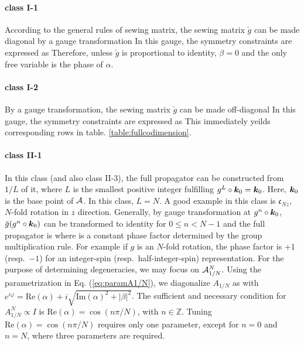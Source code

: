 \documentclass[aps, showpacs, twocolumn, notitlepage, superscriptaddress]{revtex4-1}
\begin{document}
\paragraph*{class I-1} According to the general rules of sewing matrix, the sewing matrix $\breve{g}$ can be made diagonal by a gauge transformation
In this gauge, the symmetry constraints are expressed as 
Therefore, unless $\breve{g}$ is proportional to identity, $\beta=0$ and the only free variable is the phase of $\alpha$.

\paragraph*{class I-2}
By a gauge transformation, the sewing matrix $\breve{g}$ can be made off-diagonal
In this gauge, the symmetry constraints are expressed as
This immediately yeilds corresponding rows in table. \ref{table:fullcodimension}.

\paragraph*{class II-1} In this class (and also class II-3), the full propagator can be constructed from $1/L$ of it, where $L$ is the smallest positive integer fulfilling $g^L\circ \boldsymbol{k}_0=\boldsymbol{k}_0$. Here, $\boldsymbol{k}_0$ is the base point of ${\cal A}$. In this class, $L=N$. A good example in this class is $\mathfrak{c}_{Nz}$, $N$-fold rotation in $z$ direction. Generally, by gauge transformation at $g^n\circ \boldsymbol{k}_0$, $\breve{g}(g^n\circ \boldsymbol{k}_0)$ can be transformed to identity for $0 \le n < N-1$ and the full propagator is
where 
is a constant phase factor determined by the group multiplication rule. For example if $g$ is an $N$-fold rotation,  the phase factor is $+1$ (resp.\ $-1$) for an integer-spin (resp.\ half-integer-spin) representation. For the purpose of determining degeneracies, we may focus on
${\cal A}_{1/N}^N$. Using the parametrization in Eq. (\ref{eq:paramA1/N}), we diagonalize $A_{1/N}$ as 
with $e^{i\varphi}=\text{Re}(\alpha)+i\sqrt{\text{Im}(\alpha)^2+|\beta|^2}$. The sufficient and necessary condition for $A_{1/N}^N \propto I$ is $\text{Re}(\alpha)=\cos(n\pi/N)$, with $n\in\mathbb{Z}$. Tuning $\text{Re}(\alpha)=\cos(n\pi/N)$ requires only one parameter, except for $n=0$ and $n=N$, where three parameters are required.
\end{document}
